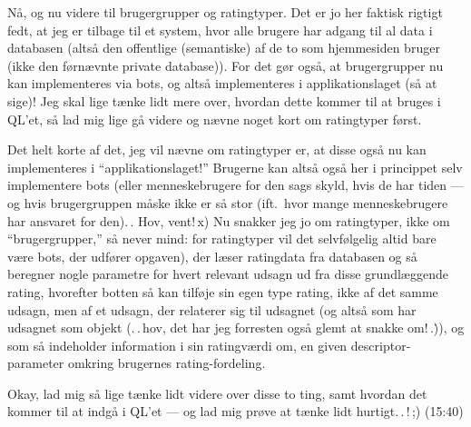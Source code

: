 \documentclass{report}
\begin{document}
Nå, og nu videre til brugergrupper og ratingtyper. Det er jo her faktisk rigtigt fedt, at jeg er tilbage til et system, hvor alle brugere har adgang til al data i databasen (altså den offentlige (semantiske) af de to som hjemmesiden bruger (ikke den førnævnte private database)). For det gør også, at brugergrupper nu kan implementeres via bots, og altså implementeres i applikationslaget (så at sige)! Jeg skal lige tænke lidt mere over, hvordan dette kommer til at bruges i QL'et, så lad mig lige gå videre og nævne noget kort om ratingtyper først.

Det helt korte af det, jeg vil nævne om ratingtyper er, at disse også nu kan implementeres i ``applikationslaget!'' Brugerne kan altså også her i princippet selv implementere bots (eller menneskebrugere for den sags skyld, hvis de har tiden --- og hvis brugergruppen måske ikke er så stor (ift.\ hvor mange menneskebrugere har ansvaret for den).\,. Hov, vent!\,x) Nu snakker jeg jo om ratingtyper, ikke om ``brugergrupper,'' så never mind: for ratingtyper vil det selvfølgelig altid bare være bots, der udfører opgaven), der læser ratingdata fra databasen og så beregner nogle parametre for hvert relevant udsagn ud fra disse grundlæggende rating, hvorefter botten så kan tilføje sin egen type rating, ikke af det samme udsagn, men af et udsagn, der relaterer sig til udsagnet (og altså som har udsagnet som objekt (.\,.\,hov, det har jeg forresten også glemt at snakke om!\,.\.)), og som så indeholder information i sin ratingværdi om, en given descriptor-parameter omkring brugernes rating-fordeling. 

Okay, lad mig så lige tænke lidt videre over disse to ting, samt hvordan det kommer til at indgå i QL'et --- og lad mig prøve at tænke lidt hurtigt.\,.\,!\,;) (15:40)
\end{document}
